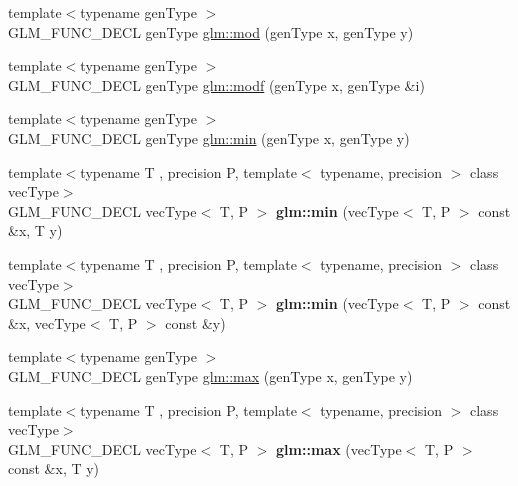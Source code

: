 \begin{DoxyCompactItemize}
\item 
{\footnotesize template$<$typename gen\-Type $>$ }\\G\-L\-M\-\_\-\-F\-U\-N\-C\-\_\-\-D\-E\-C\-L gen\-Type \hyperlink{group__core__func__common_ga12201563ef902e3b07e0d1d7656efdb1}{glm\-::mod} (gen\-Type x, gen\-Type y)
\item 
{\footnotesize template$<$typename gen\-Type $>$ }\\G\-L\-M\-\_\-\-F\-U\-N\-C\-\_\-\-D\-E\-C\-L gen\-Type \hyperlink{group__core__func__common_ga85e33f139b8db1b39b590a5713b9e679}{glm\-::modf} (gen\-Type x, gen\-Type \&i)
\item 
{\footnotesize template$<$typename gen\-Type $>$ }\\G\-L\-M\-\_\-\-F\-U\-N\-C\-\_\-\-D\-E\-C\-L gen\-Type \hyperlink{group__core__func__common_ga2c2bde1cec025b7ddff83c74a1113719}{glm\-::min} (gen\-Type x, gen\-Type y)
\item 
\hypertarget{group__core__func__common_ga33e66cacf3e991ef1f7d0fce6d073ff9}{{\footnotesize template$<$typename T , precision P, template$<$ typename, precision $>$ class vec\-Type$>$ }\\G\-L\-M\-\_\-\-F\-U\-N\-C\-\_\-\-D\-E\-C\-L vec\-Type$<$ T, P $>$ {\bfseries glm\-::min} (vec\-Type$<$ T, P $>$ const \&x, T y)}\label{group__core__func__common_ga33e66cacf3e991ef1f7d0fce6d073ff9}

\item 
\hypertarget{group__core__func__common_ga502b20a691e374cf42dea6e3d126d476}{{\footnotesize template$<$typename T , precision P, template$<$ typename, precision $>$ class vec\-Type$>$ }\\G\-L\-M\-\_\-\-F\-U\-N\-C\-\_\-\-D\-E\-C\-L vec\-Type$<$ T, P $>$ {\bfseries glm\-::min} (vec\-Type$<$ T, P $>$ const \&x, vec\-Type$<$ T, P $>$ const \&y)}\label{group__core__func__common_ga502b20a691e374cf42dea6e3d126d476}

\item 
{\footnotesize template$<$typename gen\-Type $>$ }\\G\-L\-M\-\_\-\-F\-U\-N\-C\-\_\-\-D\-E\-C\-L gen\-Type \hyperlink{group__core__func__common_ga98caa7f95a94c86a86ebce893a45326c}{glm\-::max} (gen\-Type x, gen\-Type y)
\item 
\hypertarget{group__core__func__common_ga1a31d3f13a4bd0aa9828e263b7ac5896}{{\footnotesize template$<$typename T , precision P, template$<$ typename, precision $>$ class vec\-Type$>$ }\\G\-L\-M\-\_\-\-F\-U\-N\-C\-\_\-\-D\-E\-C\-L vec\-Type$<$ T, P $>$ {\bfseries glm\-::max} (vec\-Type$<$ T, P $>$ const \&x, T y)}\label{group__core__func__common_ga1a31d3f13a4bd0aa9828e263b7ac5896}


\end{DoxyCompactItemize}
